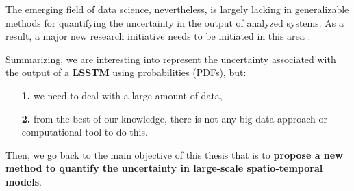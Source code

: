 The emerging field of data science, nevertheless, is largely lacking in generalizable methods for quantifying the uncertainty in the output of analyzed systems. As a result, a major new research initiative needs to be initiated in this area \cite{Tobergte2013}.

Summarizing, we are interesting into represent the uncertainty associated with the output of a \textbf{LSSTM} using probabilities (PDFs), but:
\begin{itemize}
\item[\textbf{1.}] we need to deal with a large amount of data,
\item[\textbf{2.}] from the best of our knowledge, there is not any big data approach or computational tool to do this.
\end{itemize}

Then, we go back to the main objective of this thesis that is to \textbf{propose a new method to quantify the uncertainty in large-scale spatio-temporal models}.


